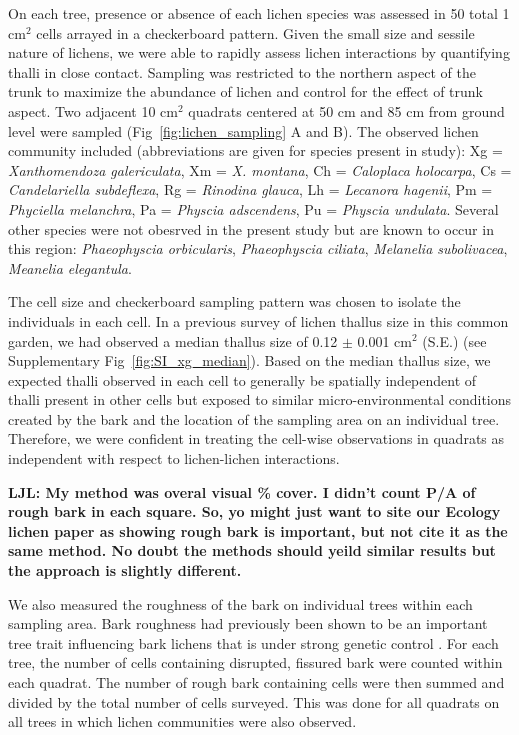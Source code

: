 \documentclass[11pt,twocolumn,twoside,lineno]{pnas-new}
\begin{document}
{On each tree, presence or absence of each lichen species was assessed
in 50 total 1 cm$^2$ cells arrayed in a checkerboard pattern. Given
the small size and sessile nature of lichens, we were able to rapidly
assess lichen interactions by quantifying thalli in close
contact. Sampling was restricted to the northern aspect of the trunk
to maximize the abundance of lichen and control for the effect of
trunk aspect. Two adjacent 10 cm$^2$ quadrats centered at 50 cm and 85
cm from ground level were sampled (Fig~\ref{fig:lichen_sampling} A and
B). The observed lichen community included (abbreviations are given
for species present in study): Xg = \textit{Xanthomendoza
  galericulata}, Xm = \textit{X. montana}, Ch = \textit{Caloplaca
  holocarpa}, Cs = \textit{Candelariella subdeflexa}, Rg =
\textit{Rinodina glauca}, Lh = \textit{Lecanora hagenii}, Pm =
\textit{Phyciella melanchra}, Pa = \textit{Physcia adscendens}, Pu =
\textit{Physcia undulata}. Several other species were not obesrved in
the present study but are known to occur in this region:
\textit{Phaeophyscia orbicularis}, \textit{Phaeophyscia ciliata},
\textit{Melanelia subolivacea}, \textit{Meanelia elegantula}.


The cell size and checkerboard sampling pattern was chosen to isolate
the individuals in each cell. In a previous survey of lichen thallus
size in this common garden, we had observed a median thallus size of
0.12 $\pm$ 0.001 cm$^2$ (S.E.) (see Supplementary
Fig~\ref{fig:SI_xg_median}). Based on the median thallus size, we
expected thalli observed in each cell to generally be spatially
independent of thalli present in other cells but exposed to similar
micro-environmental conditions created by the bark and the location of
the sampling area on an individual tree. Therefore, we were confident
in treating the cell-wise observations in quadrats as independent with
respect to lichen-lichen interactions.

\textbf{LJL: My method was overal visual \% cover. I didn’t count P/A
  of rough bark in each square. So, yo might just want to site our
  Ecology lichen paper as showing rough bark is important, but not
  cite it as the same method. No doubt the methods should yeild
  similar results but the approach is slightly different.}


We also measured the roughness of the bark on individual trees within
each sampling area. Bark roughness had previously been shown to be an
important tree trait influencing bark lichens \cite{Lamit2011} that is
under strong genetic control \cite{Bdeir2017}. For each tree, the
number of cells containing disrupted, fissured bark were counted
within each quadrat. The number of rough bark containing cells were
then summed and divided by the total number of cells surveyed. This
was done for all quadrats on all trees in which lichen communities
were also observed.

}
\end{document}
